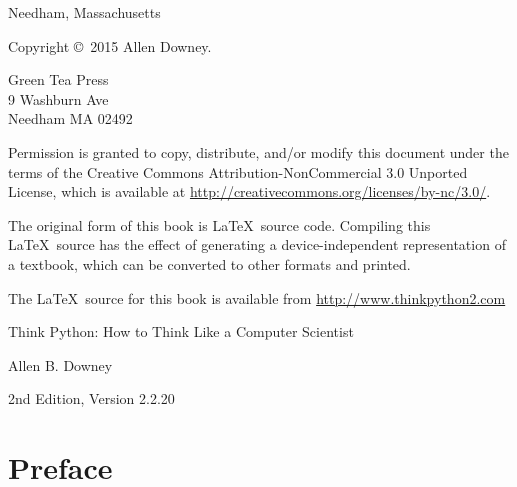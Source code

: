 \documentclass[
DIV=11,
fontsize=12,
twoside,
headinclude=false,
titlepage=firstiscover,
abstract=true,
headsepline=true,
footsepline=true,
chapterprefix=true, %
headings=big,
bibliography=totoc,%
captions=tableheading
]{scrbook}
\newcommand{\thetitle}{Think Python: How to Think Like a Computer Scientist}
\newcommand{\theversion}{2nd Edition, Version 2.2.20}
\newcommand{\thedate}{}
\theoremstyle{definition}
\begin{document}
\begin{latexonly}
\begin{flushright}
{\small Needham, Massachusetts}

\vfill

\end{flushright}


\pagebreak
\thispagestyle{empty}

{\small
Copyright \copyright ~2015 Allen Downey.


\vspace{0.2in}

\begin{flushleft}
Green Tea Press       \\
9 Washburn Ave        \\
Needham MA 02492
\end{flushleft}

Permission is granted to copy, distribute, and/or modify this document
under the terms of the Creative Commons Attribution-NonCommercial 3.0 Unported
License, which is available at \url{http://creativecommons.org/licenses/by-nc/3.0/}.

The original form of this book is \LaTeX\ source code.  Compiling this
\LaTeX\ source has the effect of generating a device-independent
representation of a textbook, which can be converted to other formats
and printed.

The \LaTeX\ source for this book is available from
\url{http://www.thinkpython2.com}

\vspace{0.2in}

} %

\end{latexonly}



\begin{htmlonly}


{\Large \thetitle}

{\large Allen B. Downey}

\theversion

\thedate

\setcounter{chapter}{-1}

\end{htmlonly}

\fi


\chapter{Preface}
\end{document}
